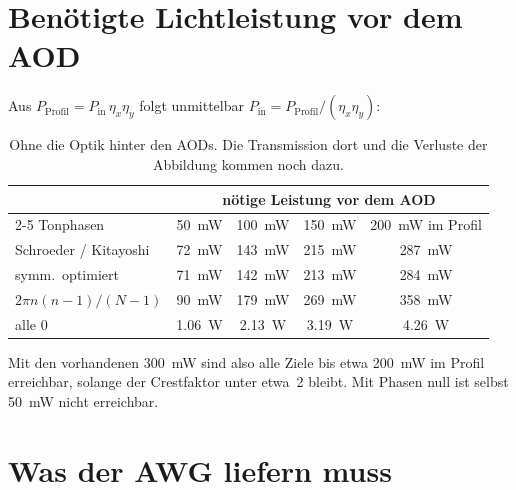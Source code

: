 \documentclass[11pt,a4paper]{article}
\begin{document}
\section{Benötigte Lichtleistung vor dem AOD}

Aus $P_\mathrm{Profil}=P_\mathrm{in}\,\eta_x\eta_y$ folgt unmittelbar
$P_\mathrm{in}=P_\mathrm{Profil}/(\eta_x\eta_y)$:

\begin{table}[htbp]
\centering\small
\begin{tabular}{lcccc}
\toprule
 & \multicolumn{4}{c}{nötige Leistung vor dem AOD}\\
\cmidrule(lr){2-5}
Tonphasen & \SI{50}{\milli\watt} & \SI{100}{\milli\watt} & \SI{150}{\milli\watt} & \SI{200}{\milli\watt} im Profil\\
\midrule
Schroeder / Kitayoshi & \SI{72}{\milli\watt} & \SI{143}{\milli\watt} & \SI{215}{\milli\watt} & \SI{287}{\milli\watt}\\
symm.\ optimiert      & \SI{71}{\milli\watt} & \SI{142}{\milli\watt} & \SI{213}{\milli\watt} & \SI{284}{\milli\watt}\\
$2\pi n(n-1)/(N-1)$   & \SI{90}{\milli\watt} & \SI{179}{\milli\watt} & \SI{269}{\milli\watt} & \SI{358}{\milli\watt}\\
alle 0                & \SI{1,06}{\watt}     & \SI{2,13}{\watt}      & \SI{3,19}{\watt}      & \SI{4,26}{\watt}\\
\bottomrule
\end{tabular}
\caption{Ohne die Optik hinter den AODs. Die Transmission dort und die
Verluste der Abbildung kommen noch dazu.}
\label{tab:bedarf}
\end{table}

Mit den vorhandenen \SI{300}{\milli\watt} sind also alle Ziele bis etwa
\SI{200}{\milli\watt} im Profil erreichbar, solange der Crestfaktor unter
etwa~2 bleibt. Mit Phasen null ist selbst \SI{50}{\milli\watt} nicht erreichbar.

\section{Was der AWG liefern muss}
\label{sec:reserve}
\end{document}
